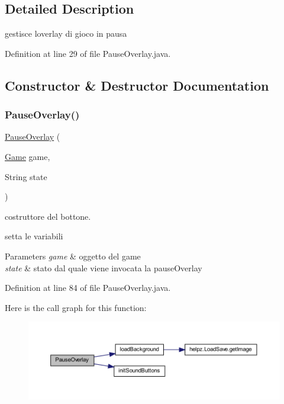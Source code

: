 \subsection{Detailed Description}
gestisce l\textquotesingle{}overlay di gioco in pausa 

Definition at line 29 of file Pause\+Overlay.\+java.



\subsection{Constructor \& Destructor Documentation}
\mbox{\label{classui_1_1_pause_overlay_a0e32a19d0569e8e64462db08f47ec52f}} 
\subsubsection{\texorpdfstring{Pause\+Overlay()}{PauseOverlay()}}
{\footnotesize\ttfamily \hyperlink{classui_1_1_pause_overlay}{Pause\+Overlay} (\begin{DoxyParamCaption}\item[{\hyperlink{classprogetto_1_1_game}{Game}}]{game,  }\item[{String}]{state }\end{DoxyParamCaption})}



costruttore del bottone. 

setta le variabili


\begin{DoxyParams}{Parameters}
{\em game} & oggetto del game \\
\hline
{\em state} & stato dal quale viene invocata la pause\+Overlay \\
\hline
\end{DoxyParams}


Definition at line 84 of file Pause\+Overlay.\+java.

Here is the call graph for this function\+:\nopagebreak
\begin{figure}[H]
\begin{center}
\leavevmode
\includegraphics[width=350pt]{classui_1_1_pause_overlay_a0e32a19d0569e8e64462db08f47ec52f_cgraph}
\end{center}
\end{figure}


